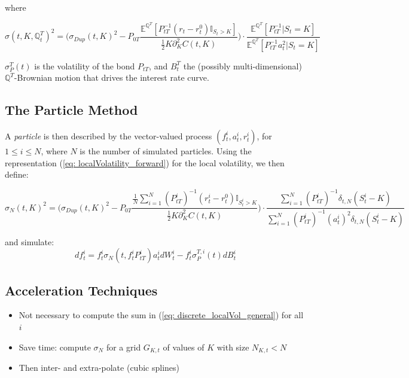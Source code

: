 where 

\begin{equation}\label{eq: localVolatility_forward}
\sigma(t,K,\mathbb{Q}_t^T)^2=\bigg( \sigma_{Dup}(t,K)^2-P_{0T} \frac{ \mathbb{E}^{\mathbb{Q}^T}[ P_{tT}^{-1}(r_t-r^0_t)\mathbb{I}_{S_t>K} ]}{ \frac{1}{2}K\partial^2_KC(t,K) } \bigg)\cdot  \frac{\mathbb{E}^{\mathbb{Q}^T}[P_{tT}^{-1} | S_t = K ]}{ \mathbb{E}^{\mathbb{Q}^T}[ P_{tT}^{-1}a_t^2 | S_t = K ] }
\end{equation}

$ \sigma_P^T(t) $ is the volatility of the bond $ P_{tT}$, and $B^T_t$ the (possibly multi-dimensional) $\mathbb{Q}^T$-Brownian motion that drives the interest rate curve.

\subsection{The Particle Method}
A \textit{particle} is then described by the vector-valued process $(f_t^i,a^i_t,r_t^i)$, for $1\leq i \leq N$, where $N$ is the number of simulated particles.
Using the representation (\ref{eq: localVolatility_forward}) for the local volatility, we then define:

\begin{equation}\label{eq: discrete_localVol_general}
\sigma_N(t,K)^2= \bigg( \sigma_{Dup}(t,K)^2 - P_{0T}\frac{\frac{1}{N}\sum_{i=1}^N (P_{tT}^{i})^{-1}(r_t^i-r_t^0)\mathbb{I}_{S_t^i>K} }{\frac{1}{2}K\partial^2_KC(t,K)}\bigg)\cdot\frac{\sum_{i=1}^N (P_{tT}^{i})^{-1} \delta_{t,N}(S_t^i-K)}{\sum_{i=1}^N (P_{tT}^{i})^{-1} (a_t^i)^2\delta_{t,N}(S_t^i-K)}
\end{equation}

and simulate:
\begin{equation}\label{eq: discrete_forwardPrice}
df_t^i = f_t^i\sigma_N(t,f_t^i P_{tT}^i)a_t^idW_t^i-f_t^i\sigma_P^{T,i}(t)dB_t^i
\end{equation}

\subsection{Acceleration Techniques}
\begin{itemize}
\item Not necessary to compute the sum in (\ref{eq: discrete_localVol_general}) for all $i$
\item Save time: compute $\sigma_N$ for a grid $G_{K,t}$ of values of $K$ with size $N_{K,t}<N$
\item Then inter- and extra-polate (cubic splines)
\end{itemize}

